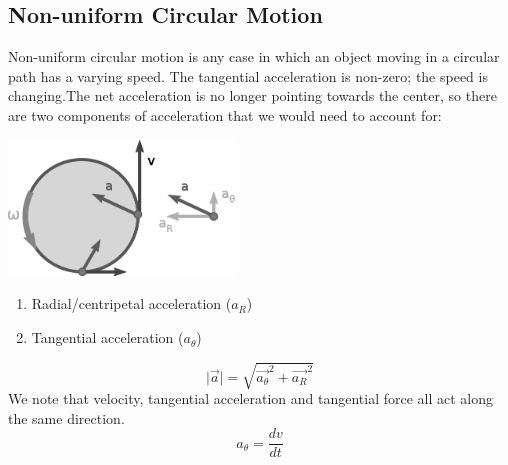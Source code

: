 \documentclass{article}
\begin{document}
  	\subsection{Non-uniform Circular Motion}
    	Non-uniform circular motion is any case in which an object moving in a circular path has a varying speed. The tangential acceleration is non-zero; the speed is changing.The net acceleration is no longer pointing towards the center, so there are two components of acceleration that we would need to account for:\vspace{1ex}
        \begin{multicols}{2}
            \centerline{\includegraphics[width=6cm]{noncirc.png}}
       	\columnbreak
        	\begin{enumerate}
        		\item Radial/centripetal acceleration ($a_R$)
            	\item Tangential acceleration ($a_\theta$)
        	\end{enumerate}
        	\[
            	\lvert\vec{a}\rvert=\sqrt{\vec{a_\theta}^2+\vec{a_R}^2}
            \]
            We note that velocity, tangential acceleration and tangential force all act along the same direction.
            \[
            	a_\theta=\frac{dv}{dt}
            \]
        \end{multicols}
        
\end{document}
